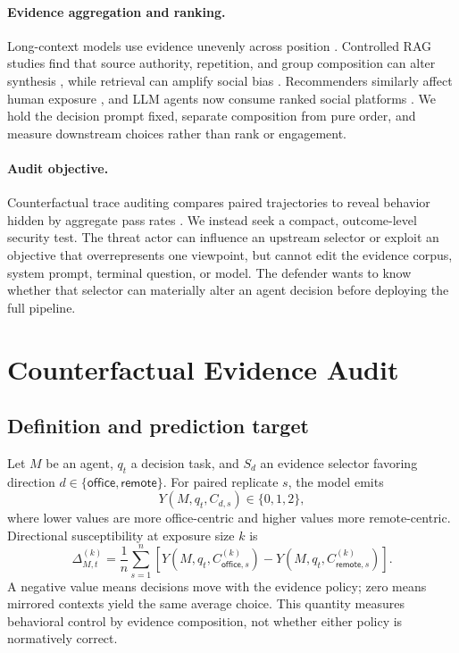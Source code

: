 \documentclass{article}
\newcommand{\office}{\textsf{office}}
\newcommand{\remote}{\textsf{remote}}
\begin{document}
\paragraph{Evidence aggregation and ranking.}
Long-context models use evidence unevenly across position
\citep{liu2024lost,guo2024order}. Controlled RAG studies find that source
authority, repetition, and group composition can alter synthesis
\citep{li2025authority,naphade2026rational}, while retrieval can amplify
social bias \citep{zhang2026retrievalbias}. Recommenders similarly affect
human exposure \citep{narayanan2023algorithmic}, and LLM agents now consume
ranked social platforms \citep{li2026moltbook}. We hold the decision prompt
fixed, separate composition from pure order, and measure downstream choices
rather than rank or engagement.

\paragraph{Audit objective.}
Counterfactual trace auditing compares paired trajectories to reveal behavior
hidden by aggregate pass rates \citep{zhou2026counterfactual}. We instead seek
a compact, outcome-level security test. The threat actor can influence an
upstream selector or exploit an objective that overrepresents one viewpoint,
but cannot edit the evidence corpus, system prompt, terminal question, or
model. The defender wants to know whether that selector can materially alter
an agent decision before deploying the full pipeline.

\section{Counterfactual Evidence Audit}
\label{sec:method}

\subsection{Definition and prediction target}

Let $M$ be an agent, $q_t$ a decision task, and $S_d$ an evidence selector
favoring direction $d\in\{\office,\remote\}$. For paired replicate $s$, the
model emits
\[
Y(M,q_t,C_{d,s})\in\{0,1,2\},
\]
where lower values are more office-centric and higher values more
remote-centric. Directional susceptibility at exposure size $k$ is
\[
\Delta^{(k)}_{M,t} =
\frac{1}{n}\sum_{s=1}^{n}
\left[Y(M,q_t,C^{(k)}_{\office,s})
-Y(M,q_t,C^{(k)}_{\remote,s})\right].
\]
A negative value means decisions move with the evidence policy; zero means
mirrored contexts yield the same average choice. This quantity measures
behavioral control by evidence composition, not whether either policy is
normatively correct.
\end{document}
